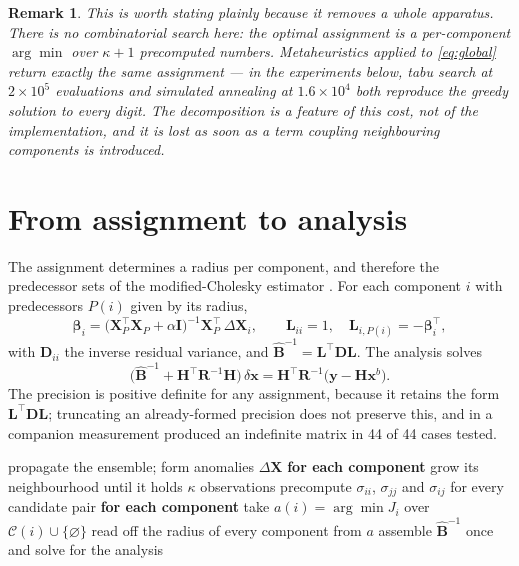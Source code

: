 \documentclass[11pt,a4paper]{article}
\newtheorem{remark}{Remark}
\newcommand{\xb}{\mathbf{x}^{b}}
\newcommand{\Bmat}{\mathbf{B}}
\newcommand{\Lmat}{\mathbf{L}}
\newcommand{\Dmat}{\mathbf{D}}
\newcommand{\Hmat}{\mathbf{H}}
\newcommand{\Rmat}{\mathbf{R}}
\begin{document}
\begin{remark}
This is worth stating plainly because it removes a whole apparatus. There is no
combinatorial search here: the optimal assignment is a per-component
$\arg\min$ over $\kappa + 1$ precomputed numbers. Metaheuristics applied to
\eqref{eq:global} return exactly the same assignment --- in the experiments
below, tabu search at $2\times10^{5}$ evaluations and simulated annealing at
$1.6\times10^{4}$ both reproduce the greedy solution to every digit. The
decomposition is a feature of this cost, not of the implementation, and it is
lost as soon as a term coupling neighbouring components is introduced.
\end{remark}

\section{From assignment to analysis}

The assignment determines a radius per component, and therefore the predecessor
sets of the modified-Cholesky estimator \cite{bickel2008,nino2018}. For each
component $i$ with predecessors $P(i)$ given by its radius,
%
\begin{equation}
  \boldsymbol{\beta}_{i}
  = \big(\mathbf{X}_{P}^{\top}\mathbf{X}_{P} + \alpha\mathbf{I}\big)^{-1}
    \mathbf{X}_{P}^{\top}\,\Delta\mathbf{X}_{i},
  \qquad
  \Lmat_{ii} = 1, \quad \Lmat_{i,P(i)} = -\boldsymbol{\beta}_{i}^{\top},
\end{equation}
%
with $\Dmat_{ii}$ the inverse residual variance, and
$\widehat{\Bmat}^{-1} = \Lmat^{\top}\Dmat\Lmat$. The analysis solves
%
\begin{equation}
  \big(\widehat{\Bmat}^{-1} + \Hmat^{\top}\Rmat^{-1}\Hmat\big)\,
  \delta\mathbf{x} = \Hmat^{\top}\Rmat^{-1}\big(\mathbf{y} - \Hmat\xb\big).
\end{equation}
%
The precision is positive definite for any assignment, because it retains the
form $\Lmat^{\top}\Dmat\Lmat$; truncating an already-formed precision does not
preserve this, and in a companion measurement produced an indefinite matrix in
44 of 44 cases tested.

\begin{algorithm}[t]
\caption{One assimilation cycle}
\begin{algorithmic}[1]
\State propagate the ensemble; form anomalies $\Delta\mathbf{X}$
\State \textbf{for each component} grow its neighbourhood until it holds
       $\kappa$ observations
\State precompute $\sigma_{ii}$, $\sigma_{jj}$ and $\sigma_{ij}$ for every
       candidate pair
\State \textbf{for each component} take
       $a(i) = \arg\min J_{i}$ over $\mathcal{C}(i)\cup\{\varnothing\}$
\State read off the radius of every component from $a$
\State assemble $\widehat{\Bmat}^{-1}$ once and solve for the analysis
\end{algorithmic}
\end{algorithm}
\end{document}
